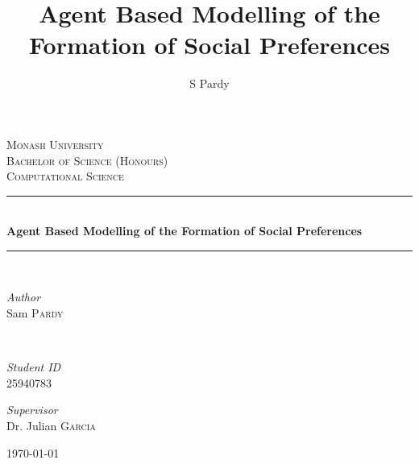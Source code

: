 \documentclass[11pt]{article}
\title{Agent Based Modelling of the Formation of Social Preferences}
\author{S Pardy}
\begin{document}
\begin{titlepage}
	\newcommand{\HRule}{\rule{\linewidth}{0.5mm}} %
	
	\center %
	
	
	\textsc{\LARGE Monash University}\\[1.5cm]	
	\textsc{\Large Bachelor of Science (Honours)}\\[0.5cm] %
	
	\textsc{\large Computational Science}\\[0.5cm] %
	
	
	\HRule\\[0.4cm]
	
	{\huge\bfseries Agent Based Modelling of the Formation of Social Preferences}\\[0.4cm]
	
	\HRule\\[1.5cm]
	
	
	\begin{minipage}{0.4\textwidth}
		\begin{flushleft}
			\large
			\textit{Author}\\
			Sam \textsc{Pardy}
		\end{flushleft}
	\end{minipage}
	~
	\begin{minipage}{0.4\textwidth}
		\begin{flushright}
			\large 
			\textit{Student ID}\\
		25940783   
		\end{flushright}
	\end{minipage}
	\vfill
	\vfill
	{\large
	\textit{Supervisor}\\
	Dr. Julian \textsc{Garcia}}
	
	
	\vfill\vfill\vfill %
	
	{\large\today} %

	\vfill %
	
\end{titlepage}
\hypersetup{colorlinks, citecolor=black, filecolor=black, linkcolor=black urlcolor=black}
\end{document}
